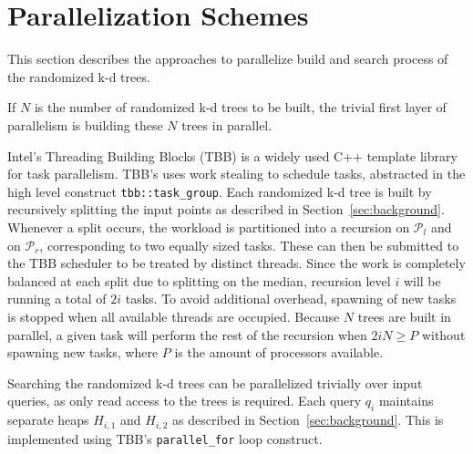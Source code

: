 \section{Parallelization Schemes}
  \label{sec:method}

This section describes the approaches to parallelize build and search process
 of the randomized k-d trees. 

If $N$ is the number of randomized k-d trees to be built, the trivial first
 layer of parallelism is building these $N$ trees in parallel.

Intel's Threading Building Blocks (TBB) %
is a widely used C++ template library for
task parallelism. TBB's uses work stealing to schedule tasks, abstracted in the high level construct \texttt{tbb::task\_group}. Each randomized k-d tree is built by recursively splitting the input points as described in Section~\ref{sec:background}.
Whenever a split occurs, the workload is partitioned into a recursion on $\mathcal{P}_l$ and on $\mathcal{P}_r$, corresponding to two equally sized tasks. These can then be submitted to the TBB scheduler to be treated by distinct threads. Since the work is completely balanced at each split due to splitting on the median, recursion level $i$ will be running a total of $2i$ tasks. To avoid additional overhead, spawning of new tasks is stopped when all available threads are occupied. Because
$N$ trees are built in parallel, a given task will perform the rest of the recursion when $2 i N\geq P$ without spawning new tasks, where $P$ is the amount of processors available.

   Searching the randomized k-d trees can be parallelized trivially over input queries, as only read access to the trees is required. Each query $q_i$ maintains separate heaps $H_{i,1}$ and $H_{i,2}$ as described in Section~\ref{sec:background}. This is implemented using TBB's \texttt{parallel\_for} loop construct. 

